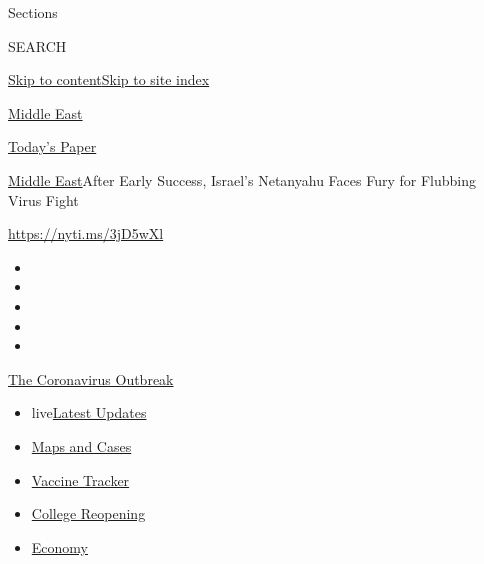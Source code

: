 Sections

SEARCH

\protect\hyperlink{site-content}{Skip to
content}\protect\hyperlink{site-index}{Skip to site index}

\href{https://www.nytimes.com/section/world/middleeast}{Middle East}

\href{https://myaccount.nytimes.com/auth/login?response_type=cookie\&client_id=vi}{}

\href{https://www.nytimes.com/section/todayspaper}{Today's Paper}

\href{/section/world/middleeast}{Middle East}\textbar{}After Early
Success, Israel's Netanyahu Faces Fury for Flubbing Virus Fight

\url{https://nyti.ms/3jD5wXl}

\begin{itemize}
\item
\item
\item
\item
\item
\end{itemize}

\href{https://www.nytimes.com/news-event/coronavirus?action=click\&pgtype=Article\&state=default\&region=TOP_BANNER\&context=storylines_menu}{The
Coronavirus Outbreak}

\begin{itemize}
\tightlist
\item
  live\href{https://www.nytimes.com/2020/08/04/world/coronavirus-covid-19.html?action=click\&pgtype=Article\&state=default\&region=TOP_BANNER\&context=storylines_menu}{Latest
  Updates}
\item
  \href{https://www.nytimes.com/interactive/2020/us/coronavirus-us-cases.html?action=click\&pgtype=Article\&state=default\&region=TOP_BANNER\&context=storylines_menu}{Maps
  and Cases}
\item
  \href{https://www.nytimes.com/interactive/2020/science/coronavirus-vaccine-tracker.html?action=click\&pgtype=Article\&state=default\&region=TOP_BANNER\&context=storylines_menu}{Vaccine
  Tracker}
\item
  \href{https://www.nytimes.com/2020/08/02/us/covid-college-reopening.html?action=click\&pgtype=Article\&state=default\&region=TOP_BANNER\&context=storylines_menu}{College
  Reopening}
\item
  \href{https://www.nytimes.com/live/2020/08/03/business/stock-market-today-coronavirus?action=click\&pgtype=Article\&state=default\&region=TOP_BANNER\&context=storylines_menu}{Economy}
\end{itemize}

